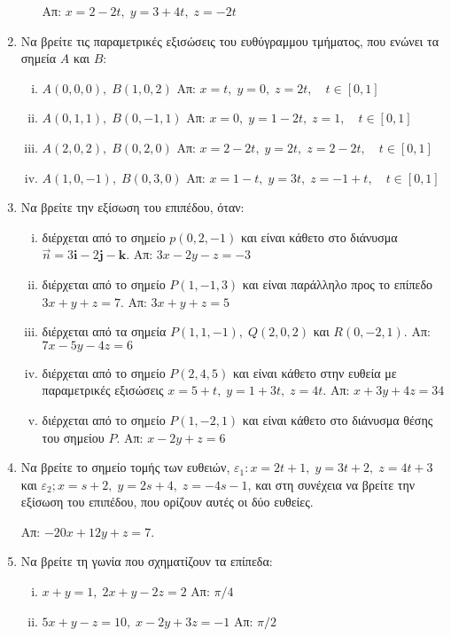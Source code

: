 \begin{enumerate}
\begin{enumerate}[i)]
        \hfill Απ: $ x=2-2t, \; y=3+4t, \; z=-2t $  
    \end{enumerate}

  \item Να βρείτε τις παραμετρικές εξισώσεις του ευθύγραμμου τμήματος, που ενώνει 
    τα σημεία $A$ και $B$:
    \begin{enumerate}[i)]
      \item $ A(0,0,0), \; B(1,0,2) $ \hfill Απ: $ x=t, \; y=0, \; z=2t, \quad t \in
        [0,1] $  
      \item $ A(0,1,1), \; B(0,-1,1) $ \hfill Απ: $ x=0, \; y=1-2t, \; z=1, \quad t \in
        [0,1] $ 
      \item $ A(2,0,2), \; B(0,2,0) $ \hfill Απ: $ x=2-2t, \; y=2t, \; z=2-2t, 
        \quad t \in [0,1] $ 
      \item $ A(1,0,-1), \; B(0,3,0) $ \hfill Απ: $ x=1-t, \; y=3t, \; z=-1+t, 
        \quad t \in [0,1] $ 
    \end{enumerate}

  \item Να βρείτε την εξίσωση του επιπέδου, όταν:
    \begin{enumerate}[i)]
      \item διέρχεται από το σημείο $ p(0,2,-1) $ και είναι κάθετο στο διάνυσμα 
        $ \vec{n} = 3 \mathbf{i}-2 \mathbf{j}- \mathbf{k} $. 
        \hfill Απ: $ 3x-2y-z=-3 $ 

      \item διέρχεται από το σημείο $ P(1,-1,3) $ και είναι παράλληλο προς το επίπεδο 
        $ 3x+y+z=7 $.
        \hfill Απ: $ 3x+y+z=5 $  

      \item διέρχεται από τα σημεία $ P(1,1,-1), \; Q(2,0,2) $ και $ R(0,-2,1) $.
        \hfill Απ: $ 7x-5y-4z=6 $ 

      \item διέρχεται από το σημείο $ P(2,4,5) $ και είναι κάθετο στην ευθεία με
        παραμετρικές εξισώσεις $ x=5+t, \; y=1+3t, \; z=4t $.
        \hfill Απ: $ x+3y+4z=34 $ 

      \item διέρχεται από το σημείο $ P(1,-2,1) $ και είναι κάθετο στο διάνυσμα θέσης 
        του σημείου $ P $.
        \hfill Απ: $ x-2y+z=6 $ 
    \end{enumerate}

  \item Να βρείτε το σημείο τομής των ευθειών, $ \varepsilon _{1}: x=2t+1, \; y=3t+2, \;
    z=4t+3$ και $ \varepsilon _{2}; x=s+2, \; y=2s+4, \; z=-4s-1 $, και στη συνέχεια να 
    βρείτε την εξίσωση του επιπέδου, που ορίζουν αυτές οι δύο ευθείες.

    \hfill Απ: $ -20x+12y+z=7 $. 
    
  \item Να βρείτε τη γωνία που σχηματίζουν τα επίπεδα:
    \begin{enumerate}[i)]
      \item $ x+y=1, \; 2x+y-2z=2 $ \hfill Απ: $ \pi /4 $ 
      \item $5x+y-z=10, \; x-2y+3z=-1$ \hfill Απ: $ \pi /2 $ 
    \end{enumerate}
\end{enumerate}



